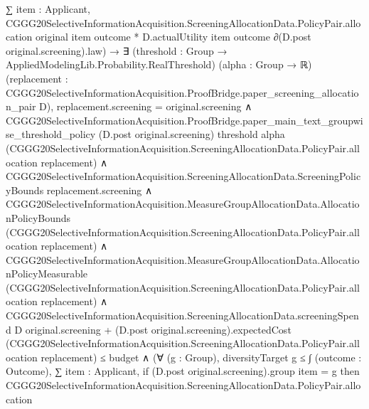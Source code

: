 \documentclass[10pt]{article}
\begin{document}
\begin{ReviewVerbatim}
                                ∑ item : Applicant,
                                  CGGG20SelectiveInformationAcquisition.ScreeningAllocationData.PolicyPair.allocation
                                      original item outcome *
                                    D.actualUtility item outcome ∂(D.post original.screening).law) →
                      ∃ (threshold : Group → AppliedModelingLib.Probability.RealThreshold) (alpha : Group → ℝ)
                        (replacement :
                        CGGG20SelectiveInformationAcquisition.ProofBridge.paper_screening_allocation_pair D),
                        replacement.screening = original.screening ∧
                          CGGG20SelectiveInformationAcquisition.ProofBridge.paper_main_text_groupwise_threshold_policy
                              (D.post original.screening) threshold alpha
                              (CGGG20SelectiveInformationAcquisition.ScreeningAllocationData.PolicyPair.allocation
                                replacement) ∧
                            CGGG20SelectiveInformationAcquisition.ScreeningAllocationData.ScreeningPolicyBounds
                                replacement.screening ∧
                              CGGG20SelectiveInformationAcquisition.MeasureGroupAllocationData.AllocationPolicyBounds
                                  (CGGG20SelectiveInformationAcquisition.ScreeningAllocationData.PolicyPair.allocation
                                    replacement) ∧
                                CGGG20SelectiveInformationAcquisition.MeasureGroupAllocationData.AllocationPolicyMeasurable
                                    (CGGG20SelectiveInformationAcquisition.ScreeningAllocationData.PolicyPair.allocation
                                      replacement) ∧
                                  CGGG20SelectiveInformationAcquisition.ScreeningAllocationData.screeningSpend D
                                          original.screening +
                                        (D.post original.screening).expectedCost
                                          (CGGG20SelectiveInformationAcquisition.ScreeningAllocationData.PolicyPair.allocation
                                            replacement) ≤
                                      budget ∧
                                    (∀ (g : Group),
                                        diversityTarget g ≤
                                          ∫ (outcome : Outcome),
                                            ∑ item : Applicant,
                                              if (D.post original.screening).group item = g then
                                                CGGG20SelectiveInformationAcquisition.ScreeningAllocationData.PolicyPair.allocation

\end{ReviewVerbatim}
\end{document}
